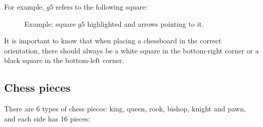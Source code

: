 \newpage 

\noindent For example, $g5$ refers to the following square:

\begin{figure}[H]
    \centering
    \newchessgame %
    \chessboard[
      setpieces={}, %
      showmover=false,
      markstyle=circle, color=red, markfield=g5, %
      pgfstyle=straightmove, color=blue, %
      markmoves={g1-g5, a5-g5}, %
      arrow=to %
    ]
    \caption{Example: square $g5$ highlighted and arrows pointing to it.}
\end{figure}

\noindent It is important to know that when placing a chessboard in the correct orientation, there should always be a white square in the bottom-right corner or a black square in the bottom-left corner.

\subsection{Chess pieces}

There are 6 types of chess pieces: king, queen, rook, bishop, knight and pawn, and each side has 16 pieces:

\begin{table}[H]
    \centering
    \caption{Number of chess pieces by type and color.}
    \label{tab:number-of-pieces}
\end{table}

